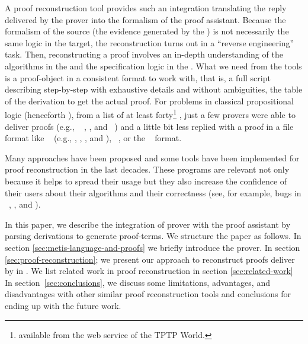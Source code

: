 \documentclass[../main.tex]{subfiles}
\begin{document}
A proof reconstruction tool provides such an integration translating 
the reply delivered by the prover into the formalism of
the proof assistant. Because the formalism of the source (the evidence
generated by the \ATP) is not necessarily the same logic in the target, the
reconstruction turns out in a ``reverse engineering'' task.
Then, reconstructing a proof involves an in-depth understanding of the
algorithms in the \ATP and the specification logic in the \ITP.
What we need from the \ATP tools is a proof-object in a consistent format
to work with, that is, a full script describing step-by-step with
exhaustive details and without ambiguities, the table of the derivation
to get the actual proof. For problems in classical propositional logic
(henceforth \CPL), from a list of at least forty\footnote{\ATPs available
from the web service  of the TPTP World.} \ATPs, just
a few provers were able to deliver proofs (e.g., ~
\cite{Barrett2011}, , and ~\cite{hillenbrand1997})
and a little bit less replied with a proof in a file format like
\TSTP~\cite{sutcliffe2004tstp} (e.g., , \Metis,
, and ), ~\cite{Stump2008}, or the
~\cite{Bohme2011} format.

Many approaches have been proposed and some tools have been implemented
for proof reconstruction in the last decades. These programs are relevant
not only because it helps to spread their usage but they also increase
the confidence of their users about their algorithms and their
correctness (see, for example, bugs in \ATPs~\cite{Keller2013},
\cite{Bohme2011}, \cite{Fleury2014} and \cite{Kanso2012}).

In this paper, we describe the integration of \Metis prover with the
proof assistant \Agda by parsing \TSTP derivations to generate
\Agda proof-terms. We structure the paper as follows.
In section \ref{sec:metis-language-and-proofs} we briefly introduce
the \Metis prover. In section \ref{sec:proof-reconstruction}; we
present our approach to reconstruct proofs deliver by \Metis in
\Agda.
We list related work in proof reconstruction in section \ref{sec:related-work}
In section~\ref{sec:conclusions}, we discuss some limitations, advantages,
and disadvantages with other similar proof reconstruction tools and
conclusions for ending up with the future work.
\end{document}

